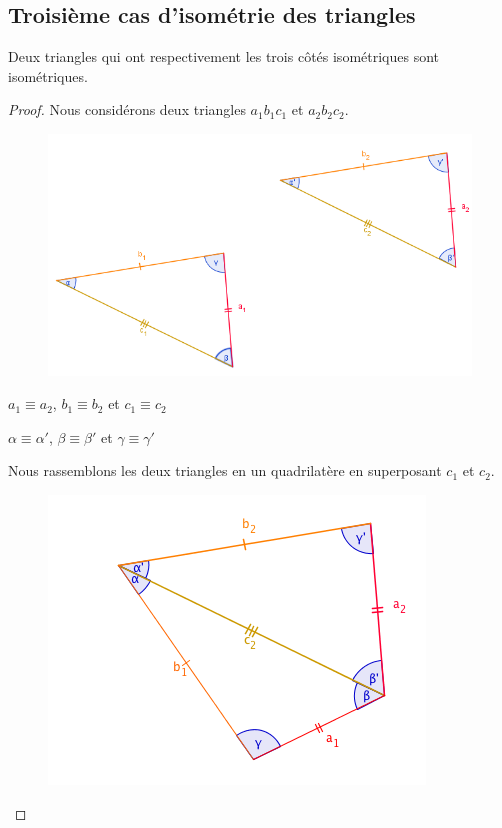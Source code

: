 \documentclass[a4paper,12pt]{article}
\begin{document}
\pagebreak
\subsection{Troisième cas d'isométrie des triangles}
\begin{theorem}
Deux triangles qui ont respectivement les trois côtés isométriques sont isométriques.
\end{theorem}
\begin{proof}
Nous considérons deux triangles $a_1b_1c_1$ et $a_2b_2c_2$.

\begin{figure}[H]
    \centering
    \includegraphics[scale=0.6]{schema/Cas_3.PNG}
\end{figure}

 \begin{hyp}
     $a_1\equiv a_2$,
     $b_1\equiv b_2$ et
     $c_1\equiv c_2$
 \end{hyp}
 \begin{concl}
     $\alpha \equiv \alpha'$,
     $\beta \equiv \beta'$ et
     $\gamma \equiv \gamma'$
 \end{concl}
 Nous rassemblons les deux triangles en un quadrilatère en superposant $c_1$ et $c_2$. 
 
 \begin{figure}[H]
    \centering
    \includegraphics[scale=0.6]{schema/Cas3_2.png}
\end{figure}
 

\end{proof}
\end{document}
